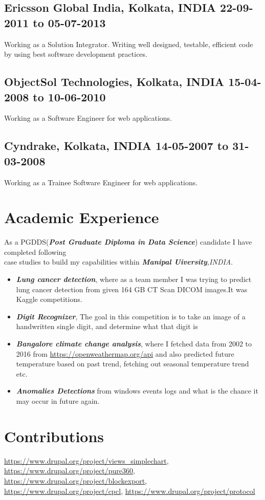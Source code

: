 \documentclass{article}
\begin{document}
\subsection{Ericsson Global India, \textnormal{\small{Kolkata, INDIA \hfill \textbf{22-09-2011 to 05-07-2013}}}}
Working as a Solution Integrator. Writing well designed, testable, efficient code by using best software development practices.
\subsection{ObjectSol Technologies, \textnormal{\small{Kolkata, INDIA \hfill \textbf{15-04-2008 to 10-06-2010}}}}
Working as a Software Engineer for web applications.
\subsection{Cyndrake, \textnormal{\small{Kolkata, INDIA \hfill \textbf{14-05-2007 to 31-03-2008}}}}
Working as a Trainee Software Engineer for web applications.

\thispagestyle{empty}
\section{Academic Experience}
As a PGDDS(\textit{\textbf{Post Graduate Diploma in Data Science}}) candidate I have completed following\\ case studies to build my capabilities within \textit{\textbf{Manipal Uiversity},INDIA}.
\begin{itemize}[leftmargin=*]
  \item \textit{\textbf{Lung cancer detection}}, where as a team member I was trying to predict lung cancer detection from given 164 GB CT Scan DICOM images.It was Kaggle competitions.
  \item \textit{\textbf{Digit Recognizer}}, The goal in this competition is to take an image of a handwritten single digit, and determine what that digit is
  \item \textit{\textbf{Bangalore climate change analysis}}, where I fetched data from 2002 to 2016 from \url{https://openweathermap.org/api} and also predicted future temperature based on past trend, fetching out seasonal temperature trend etc.
  \item \textit{\textbf{Anomalies Detections}} from windows events logs and what is the chance it may occur in future again.
\end{itemize}

\section{Contributions}
\url{https://www.drupal.org/project/views_simplechart}, \url{https://www.drupal.org/project/pure360}, \url{https://www.drupal.org/project/blockexport}, \url{https://www.drupal.org/project/cpcl}, \url{https://www.drupal.org/project/protocol}
\end{document}
